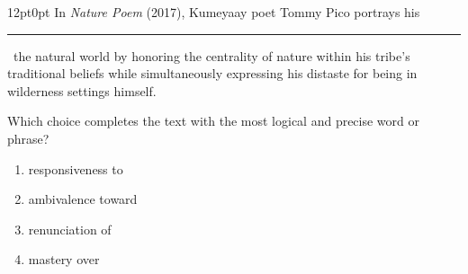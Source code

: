 \documentclass[11pt, twocolumn]{article}
\newcounter{questionnum}
\begin{document}
\vspace{6pt}\noindent
\begin{minipage}{\columnwidth}\raggedright
\noindent{}\par\vspace{8pt}
\begin{adjustwidth}{12pt}{0pt}
In \textit{Nature Poem} (2017), Kumeyaay poet Tommy Pico portrays his \,\rule{2cm}{0.4pt}\, the natural world by honoring the centrality of nature within his tribe's traditional beliefs while simultaneously expressing his distaste for being in wilderness settings himself.
\vspace{6pt}

Which choice completes the text with the most logical and precise word or phrase?
\begin{enumerate}[label=\Alph*),leftmargin=18pt,topsep=3pt,itemsep=2pt]
  \item responsiveness to
  \item ambivalence toward
  \item renunciation of
  \item mastery over
\end{enumerate}
\end{adjustwidth}
\end{minipage}\par
\end{document}

